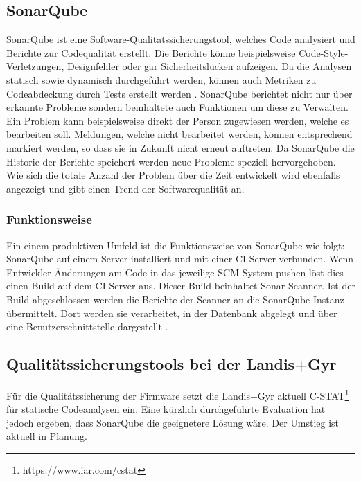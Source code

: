 \subsection{SonarQube}\label{quality:sonar}
SonarQube ist eine Software-Qualitatssicherungstool, welches Code analysiert und Berichte zur Codequalität erstellt.
Die Berichte könne beispielsweise Code-Style-Verletzungen, Designfehler oder gar Sicherheitslücken aufzeigen.
Da die Analysen statisch sowie dynamisch durchgeführt werden, können auch Metriken zu Codeabdeckung durch Tests erstellt werden \parencite{malloy_2021}.
SonarQube berichtet nicht nur über erkannte Probleme sondern beinhaltete auch Funktionen um diese zu Verwalten.
Ein Problem kann beispielsweise direkt der Person zugewiesen werden, welche es bearbeiten soll.
Meldungen, welche nicht bearbeitet werden, können entsprechend markiert werden, so dass sie in Zukunft nicht erneut auftreten.
Da SonarQube die Historie der Berichte speichert werden neue Probleme speziell hervorgehoben.
Wie sich die totale Anzahl der Problem über die Zeit entwickelt wird ebenfalls angezeigt und gibt einen Trend der Softwarequalität an.


\subsubsection{Funktionsweise}\label{sonar:funktionsweise}
Ein einem produktiven Umfeld ist die Funktionsweise von SonarQube wie folgt:
SonarQube auf einem Server installiert und mit einer \ac{CI} Server verbunden.
Wenn Entwickler Änderungen am Code in das jeweilige \ac{SCM} System pushen löst dies einen Build auf dem \ac{CI} Server aus.
Dieser Build beinhaltet Sonar Scanner.
Ist der Build abgeschlossen werden die Berichte der Scanner an die SonarQube Instanz übermittelt.
Dort werden sie verarbeitet, in der Datenbank abgelegt und über eine Benutzerschnittstelle dargestellt \parencite{malloy_2021}.

\subsection{Qualitätssicherungstools bei der Landis+Gyr}
Für die Qualitätssicherung der Firmware setzt die Landis+Gyr aktuell C-STAT\footnote{https://www.iar.com/cstat} für statische Codeanalysen ein.
Eine kürzlich durchgeführte Evaluation hat jedoch ergeben, dass SonarQube die geeignetere Lösung wäre.
Der Umstieg ist aktuell in Planung.
